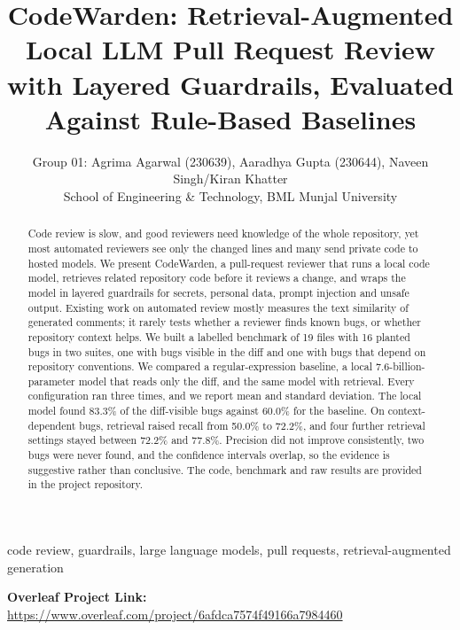 \documentclass[12pt,onecolumn,draftclsnofoot]{IEEEtran}
\begin{document}
\title{CodeWarden: Retrieval-Augmented Local LLM Pull Request Review with Layered Guardrails, Evaluated Against Rule-Based Baselines}

\author{Group 01: Agrima Agarwal (230639), Aaradhya Gupta (230644), Naveen Singh/Kiran Khatter\\
School of Engineering \& Technology, BML Munjal University}
\maketitle

\begin{abstract}
Code review is slow, and good reviewers need knowledge of the whole repository, yet most automated reviewers see only the changed lines and many send private code to hosted models. We present CodeWarden, a pull-request reviewer that runs a local code model, retrieves related repository code before it reviews a change, and wraps the model in layered guardrails for secrets, personal data, prompt injection and unsafe output. Existing work on automated review mostly measures the text similarity of generated comments; it rarely tests whether a reviewer finds known bugs, or whether repository context helps. We built a labelled benchmark of 19 files with 16 planted bugs in two suites, one with bugs visible in the diff and one with bugs that depend on repository conventions. We compared a regular-expression baseline, a local 7.6-billion-parameter model that reads only the diff, and the same model with retrieval. Every configuration ran three times, and we report mean and standard deviation. The local model found 83.3\% of the diff-visible bugs against 60.0\% for the baseline. On context-dependent bugs, retrieval raised recall from 50.0\% to 72.2\%, and four further retrieval settings stayed between 72.2\% and 77.8\%. Precision did not improve consistently, two bugs were never found, and the confidence intervals overlap, so the evidence is suggestive rather than conclusive. The code, benchmark and raw results are provided in the project repository.
\end{abstract}

\begin{IEEEkeywords}
code review, guardrails, large language models, pull requests, retrieval-augmented generation
\end{IEEEkeywords}

\noindent\textbf{Overleaf Project Link:} \url{https://www.overleaf.com/project/6afdca7574f49166a7984460}
\end{document}
